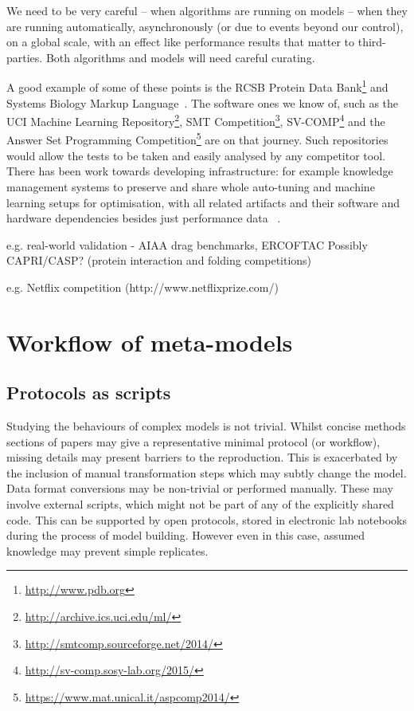 \documentclass[conference]{IEEEtran}
\begin{document}
We need to be very careful -- when algorithms are running on models -- when
they are running automatically, asynchronously (or due to events beyond our
control), on a global scale, with an effect like performance results that
matter to third-parties. Both algorithms and  models will need careful
curating.

A good example of some of these points is the RCSB Protein Data
Bank\footnote{\url{http://www.pdb.org}} and Systems Biology Markup
Language~\cite{Hucka2003,Chaouiya2013}. The software ones we know of,
such as the UCI Machine Learning
Repository\footnote{\url{http://archive.ics.uci.edu/ml/}}, SMT
Competition\footnote{\url{http://smtcomp.sourceforge.net/2014/}},
SV-COMP\footnote{\url{http://sv-comp.sosy-lab.org/2015/}} and the
Answer Set Programming
Competition\footnote{\url{https://www.mat.unical.it/aspcomp2014/}} are
on that journey. Such repositories would allow the tests to be taken
and easily analysed by any competitor tool. There has been work
towards developing infrastructure: for example knowledge management
systems to preserve and share whole auto-tuning and machine learning
setups for optimisation, with all related artifacts and their software
and hardware dependencies besides just performance data
~\cite{fursin-et-al:2014}.


e.g. real-world validation - AIAA drag benchmarks, ERCOFTAC
	Possibly CAPRI/CASP? (protein interaction and folding competitions)

e.g. Netflix competition (http://www.netflixprize.com/)


\section{Workflow of meta-models}

\subsection{Protocols as scripts}

Studying the behaviours of complex models is not trivial. Whilst 
concise methods sections of papers may give a representative minimal
protocol (or workflow), missing details may present barriers to 
the reproduction. This is exacerbated by the inclusion of manual 
transformation steps which may subtly change the model. Data format 
conversions may be non-trivial or performed manually. These may 
involve external scripts, which might not be part of any of the
explicitly shared code. This can be supported by open protocols, stored 
in electronic lab notebooks during the process of model building. However
even in this case, assumed knowledge may prevent simple replicates.
\end{document}
